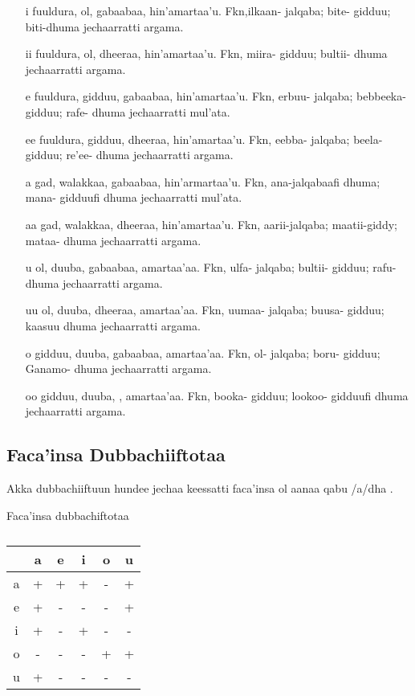 \documentclass[11pt,b5paper]{book}
\begin{document}
\begin{itemize}
\begin{itemize}
        \item[i] fuuldura, ol, gabaabaa, hin’amartaa’u. Fkn,ilkaan- jalqaba; bite- gidduu; biti-dhuma jechaarratti argama.
        \item[ii] fuuldura, ol, dheeraa, hin’amartaa’u. Fkn, miira- gidduu; bultii- dhuma jechaarratti argama.
        \item[e] fuuldura, gidduu, gabaabaa, hin’amartaa’u. Fkn, erbuu- jalqaba; bebbeeka- gidduu; rafe- dhuma jechaarratti mul'ata.
        \item[ee] fuuldura, gidduu, dheeraa, hin’amartaa’u. Fkn, eebba- jalqaba; beela- gidduu; re’ee- dhuma jechaarratti argama.
        \item[a] gad, walakkaa, gabaabaa, hin’armartaa’u. Fkn, ana-jalqabaafi dhuma; mana- gidduufi dhuma jechaarratti mul'ata.
        \item[aa] gad, walakkaa, dheeraa, hin’amartaa’u. Fkn, aarii-jalqaba; maatii-giddy; mataa- dhuma jechaarratti argama.
        \item[u] ol, duuba, gabaabaa, amartaa’aa. Fkn, ulfa- jalqaba; bultii- gidduu; rafu-dhuma jechaarratti argama.
        \item[uu] ol, duuba, dheeraa, amartaa’aa. Fkn, uumaa- jalqaba; buusa- gidduu; kaasuu dhuma jechaarratti argama.
        \item[o] gidduu, duuba, gabaabaa, amartaa’aa. Fkn, ol- jalqaba; boru- gidduu; Ganamo- dhuma jechaarratti argama.
        \item[oo] gidduu, duuba, , amartaa’aa. Fkn, booka- gidduu; lookoo- gidduufi dhuma jechaarratti argama.

\end{itemize}

\subsection{Faca'insa Dubbachiiftotaa}
Akka dubbachiiftuun hundee jechaa keessatti faca’insa ol aanaa qabu /a/dha \cite[p.17]{owens1985grammar}.  
\begin{table}[H]
	\centering
	\caption{Faca’insa dubbachiftotaa}
	\begin{tabular}{|c||c|c|c|c|c|}
		\hline
		& a & e & i & o & u \\
		\hline\hline
	a	& + & + & + & - & + \\
		\hline
	e	& + & - & - & - & + \\
		\hline
	i	& + & - & + & - & - \\
		\hline
	o	& - & - & - & + & + \\
		\hline
	u	& + & - & - & - & - \\
		\hline
	\end{tabular}
	\caption{}
\end{table}


\end{itemize}
\end{document}
